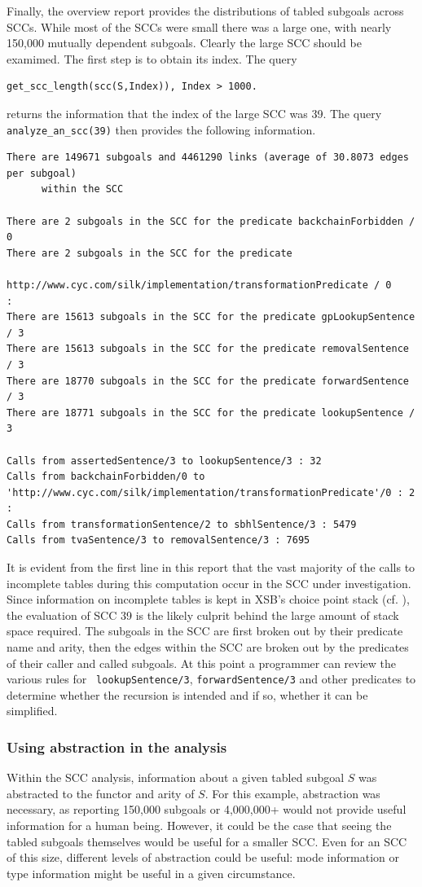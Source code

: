 \begin{example}
Finally, the overview report provides the distributions of tabled
subgoals across SCCs.  While most of the SCCs were small there was a
large one, with nearly 150,000 mutually dependent subgoals.  Clearly
the large SCC should be examimed.  The first step is to obtain its
index.  The query
%
\begin{verbatim}
get_scc_length(scc(S,Index)), Index > 1000.
\end{verbatim}
%
returns the information that the index of the large SCC was 39.  The
query {\tt analyze\_an\_scc(39)} then provides the following
information.
%
\begin{verbatim}
There are 149671 subgoals and 4461290 links (average of 30.8073 edges per subgoal) 
      within the SCC

There are 2 subgoals in the SCC for the predicate backchainForbidden / 0
There are 2 subgoals in the SCC for the predicate 
                   http://www.cyc.com/silk/implementation/transformationPredicate / 0
:
There are 15613 subgoals in the SCC for the predicate gpLookupSentence / 3
There are 15613 subgoals in the SCC for the predicate removalSentence / 3
There are 18770 subgoals in the SCC for the predicate forwardSentence / 3
There are 18771 subgoals in the SCC for the predicate lookupSentence / 3

Calls from assertedSentence/3 to lookupSentence/3 : 32
Calls from backchainForbidden/0 to 'http://www.cyc.com/silk/implementation/transformationPredicate'/0 : 2
:
Calls from transformationSentence/2 to sbhlSentence/3 : 5479
Calls from tvaSentence/3 to removalSentence/3 : 7695
\end{verbatim}
%
It is evident from the first line in this report that the vast
majority of the calls to incomplete tables during this computation
occur in the SCC under investigation.  Since information on incomplete
tables is kept in XSB's choice point stack (cf. \cite{SaSw98}), the
evaluation of SCC 39 is the likely culprit behind the large amount of
stack space required.  The subgoals in the SCC are first broken out by
their predicate name and arity, then the edges within the SCC are
broken out by the predicates of their caller and called subgoals.  At
this point a programmer can review the various rules for {\tt
  lookupSentence/3}, {\tt forwardSentence/3} and other predicates to
determine whether the recursion is intended and if so, whether it can
be simplified.
%
\end{example}

\subsubsection{Using abstraction in the analysis}
%
Within the SCC analysis, information about a given tabled subgoal $S$
was abstracted to the functor and arity of $S$.  For this example,
abstraction was necessary, as reporting 150,000 subgoals or 4,000,000+
would not provide useful information for a human being.  However, it
could be the case that seeing the tabled subgoals themselves would be
useful for a smaller SCC.  Even for an SCC of this size, different
levels of abstraction could be useful: mode information or type
information might be useful in a given circumstance.  

